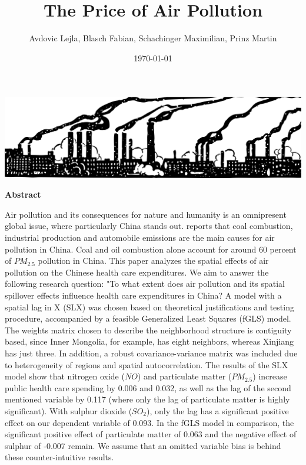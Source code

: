 \documentclass[
]{article}
\title{The Price of Air Pollution}
\author{Avdovic Lejla, Blasch Fabian, Schachinger Maximilian, Prinz Martin}
\date{\today}
\begin{document}
	\maketitle
	
	\begin{center}
		\includegraphics[width = 380pt]{pollution.png} 
	\end{center}
	\thispagestyle{empty}
	\vspace*{12pt}
	\begin{center}
		\textbf{Abstract} 
	\end{center}
	Air pollution and its consequences for nature and humanity is an omnipresent global issue, where particularly China stands out. \cite{rasch_under_nodate} reports that coal combustion, industrial production
	and automobile emissions are the main causes for
	air pollution in China. Coal and oil combustion alone account for around 60 percent of $PM_{2.5}$ pollution in China.
	This paper analyzes the spatial effects of air pollution on the Chinese health care expenditures. We aim to answer the following research question: "To what extent does air pollution and its spatial spillover effects influence health care expenditures in China? A model with a spatial lag in X (SLX) was chosen based on theoretical justifications and testing procedure, accompanied by a feasible Generalized Least Squares (fGLS) model. 
	The weights matrix chosen to describe the neighborhood structure is contiguity based, since Inner Mongolia, for example, has eight neighbors, whereas Xinjiang has just three. 
	In addition, a robust covariance-variance matrix was included due to heterogeneity of regions and spatial autocorrelation. The results of the SLX model show that nitrogen oxide ($NO$) and particulate matter ($PM_{2.5}$)
	increase public health care spending by 0.006 and 0.032, as well as the lag of the second mentioned variable by 0.117 (where only the lag of particulate matter is highly significant). With sulphur dioxide ($SO_2$), only the lag has a significant positive effect on our dependent variable of 0.093. In the fGLS model in comparison, the significant positive effect of particulate matter of 0.063 and the negative effect of sulphur of -0.007 remain. We assume that an omitted variable bias is behind these counter-intuitive results.
\end{document}
